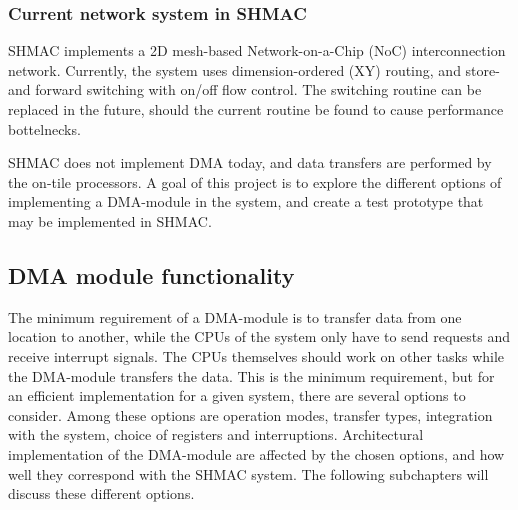 \subsubsection{Current network system in SHMAC}
SHMAC implements a 2D mesh-based Network-on-a-Chip (NoC) interconnection network. 
Currently, the system uses dimension-ordered (XY) routing, and store-and forward switching with on/off flow control. 
The switching routine can be replaced in the future, should the current routine be found to cause performance bottelnecks.

SHMAC does not implement DMA today, and data transfers are performed by the on-tile processors. 
A goal of this project is to explore the different options of implementing a DMA-module in the system, and create a test prototype that may be implemented in SHMAC.

\subsection{DMA module functionality}
The minimum reguirement of a DMA-module is to transfer data from one location to another, while the CPUs of the system only have to send requests and receive interrupt signals.
The CPUs themselves should work on other tasks while the DMA-module transfers the data.
This is the minimum requirement, but for an efficient implementation for a given system, there are several options to consider.
Among these options are operation modes, transfer types, integration with the system, choice of registers and interruptions.
Architectural implementation of the DMA-module are affected by the chosen options, and how well they correspond with the SHMAC system.
The following subchapters will discuss these different options. 

